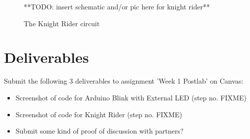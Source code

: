 \documentclass[12pt]{article}
\begin{document}
        \begin{figure}[h!]
    	   **TODO: insert schematic and/or pic here for knight rider**
    	   \caption{The Knight Rider circuit}
    \end{figure}
	
	\section*{Deliverables}
	Submit the following 3 deliverables to assignment 'Week 1 Postlab' on Canvas:
	\begin{itemize}
	    \item Screenshot of code for Arduino Blink with External LED (step no. FIXME)
	    \item Screenshot of code for Knight Rider (step no. FIXME)
	    \item Submit some kind of proof of discussion with partners?
	\end{itemize}
	
\end{document}
